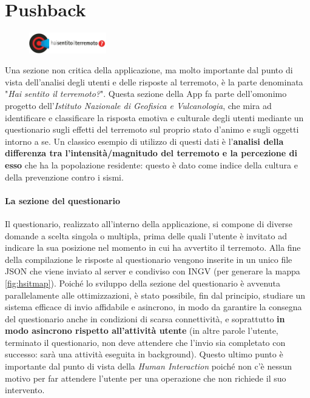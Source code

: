 \documentclass[a4paper,10pt]{memoir}
\begin{document}
\pagebreak

\section{Pushback}

\begin{figure}
\includegraphics[width=0.30\textwidth]{app/hsit}
\end{figure}

Una sezione non critica della applicazione, ma molto importante dal punto di vista dell'analisi degli utenti e delle risposte al terremoto, è la parte denominata "\textit{Hai sentito il terremoto?}". Questa sezione della App fa parte dell'omonimo progetto dell'\textit{Istituto Nazionale di Geofisica e Vulcanologia}, che mira ad identificare e classificare la risposta emotiva e culturale degli utenti mediante un questionario sugli effetti del terremoto sul proprio stato d'animo e sugli oggetti intorno a se. Un classico esempio di utilizzo di questi dati è l'\textbf{analisi della differenza tra l'intensità/magnitudo del terremoto e la percezione di esso} che ha la popolazione residente: questo è dato come indice della cultura e della prevenzione contro i sismi.

\paragraph{La sezione del questionario} Il questionario, realizzato all'interno della applicazione, si compone di diverse domande a scelta singola o multipla, prima delle quali l'utente è invitato ad indicare la sua posizione nel momento in cui ha avvertito il terremoto. Alla fine della compilazione le risposte al questionario vengono inserite in un unico file JSON che viene inviato al server e condiviso con INGV (per generare la mappa \ref{fig:hsitmap}). Poiché lo sviluppo della sezione del questionario è avvenuta parallelamente alle ottimizzazioni, è stato possibile, fin dal principio, studiare un sistema efficace di invio affidabile e asincrono, in modo da garantire la consegna del questionario anche in condizioni di scarsa connettività, e soprattutto \textbf{in modo asincrono rispetto all'attività utente} (in altre parole l'utente, terminato il questionario, non deve attendere che l'invio sia completato con successo: sarà una attività eseguita in background). Questo ultimo punto è importante dal punto di vista della \textit{Human Interaction} poiché non c'è nessun motivo per far attendere l'utente per una operazione che non richiede il suo intervento.
\end{document}
